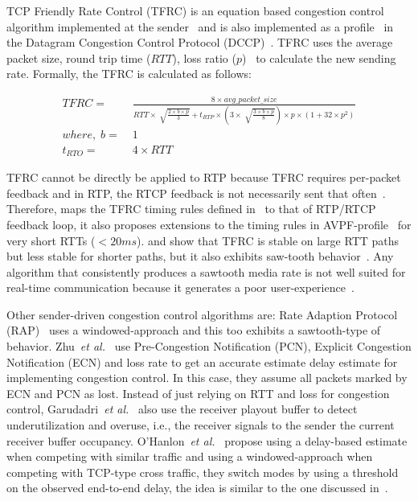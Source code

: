 TCP Friendly Rate Control (TFRC) is an equation based congestion control
algorithm implemented at the sender~\cite{tfrc_347397} and is also implemented
as a profile~\cite{rfc4342} in the Datagram Congestion Control Protocol
(DCCP)~\cite{rfc4340}. TFRC uses the average packet size, round trip time
($RTT$), loss ratio ($p$)~\cite{rfc3448} to calculate the new sending rate.
Formally, the TFRC is calculated as follows:

\begin{align*}
 TFRC = &\; \frac{8 \times avg\_packet\_size}
{RTT \times \sqrt[]{\frac{2 \times b \times p}{3}} + t_{RTP} \times 
\left( 3 \times \sqrt[]{\frac{3 \times b \times p}{8}}\right) \times p \times
\left( 1+32 \times p^2 \right)}\\
where,\; b = &\; 1\\
t_{RTO} = &\; 4 \times RTT
\end{align*}

TFRC cannot be directly be applied to RTP because TFRC requires per-packet
feedback and in RTP, the RTCP feedback is not necessarily sent that
often~\cite{draft.rmcat.feedback}. Therefore, \cite{draft.rtp.tfrc} maps the
TFRC timing rules defined in~\cite{rfc4828, rfc5348} to that of RTP/RTCP
feedback loop, it also proposes extensions to the timing rules in
AVPF-profile~\cite{rfc4585} for very short RTTs ($<20ms$).
\cite{Gharai06:ICME} and \cite{VladBalan:2007dq} show that TFRC is stable on
large RTT paths but less stable for shorter paths, but it also exhibits
saw-tooth behavior~\cite{saurin:2006:thesis}. Any algorithm that consistently
produces a sawtooth media rate is not well suited for real-time communication
because it generates a poor user-experience~\cite{Gharai:2002wt,
Zink03subjectiveimpression}.

Other sender-driven congestion control algorithms are: Rate Adaption Protocol
(RAP)~\cite{rap:752152} uses a windowed-approach and this too exhibits a
sawtooth-type of behavior. Zhu~\textit{et al.}~\cite{rmcat-nada} use
Pre-Congestion Notification (PCN), Explicit Congestion Notification (ECN) and
loss rate to get an accurate estimate delay estimate for implementing
congestion control. In this case, they assume all packets marked by ECN and
PCN as lost. Instead of just relying on RTT and loss for congestion control,
Garudadri~\textit{et al.}~\cite{4397059} also use the receiver playout buffer
to detect underutilization and overuse, i.e., the receiver signals to the
sender the current receiver buffer occupancy. O'Hanlon~\textit{et
al.}~\cite{rmcat-dflow} propose using a delay-based estimate when competing
with similar traffic and using a windowed-approach when competing with
TCP-type cross traffic, they switch modes by using a threshold on the observed
end-to-end delay, the idea is similar to the one discussed
in~\cite{budzisz2011fair}.




